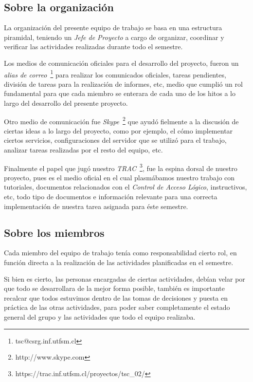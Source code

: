 
\subsection{Sobre la organización}

La organización del presente equipo de trabajo se basa en una estructura piramidal,
teniendo un \emph{Jefe de Proyecto} a cargo de organizar, coordinar y verificar
las actividades realizadas durante todo el semestre.

Los medios de comunicación oficiales para el desarrollo del proyecto,
fueron un \emph{alias de correo}~\footnote{tsc@csrg.inf.utfsm.cl} para realizar los comunicados oficiales,
tareas pendientes, división de tareas para la realización de informes, etc,
medio que cumplió un rol fundamental para que cada miembro se enterara
de cada uno de los hitos a lo largo del desarrollo del presente proyecto.

Otro medio de comunicación fue \emph{Skype}~\footnote{http://www.skype.com} que ayudó fielmente a la discusión
de ciertas ideas a lo largo del proyecto, como por ejemplo, el cómo implementar
ciertos servicios, configuraciones del servidor que se utilizó para el trabajo,
analizar tareas realizadas por el resto del equipo, etc.

Finalmente el papel que jugó nuestro \emph{TRAC}~\footnote{https://trac.inf.utfsm.cl/proyectos/tsc\_02/},
fue la espina dorsal de nuestro proyecto, pues es el medio oficial en el cual plasmábamos
nuestro trabajo con tutoriales, documentos relacionados con el \emph{Control de Acceso Lógico},
instructivos, etc, todo tipo de documentos e información relevante para una correcta implementación
de nuestra tarea asignada para éste semestre.


\subsection{Sobre los miembros}

Cada miembro del equipo de trabajo tenía como responsabilidad cierto rol,
en función directa a la realización de las actividades planificadas en el
semestre.

Si bien es cierto, las personas encargadas de ciertas actividades, debían
velar por que todo se desarrollara de la mejor forma posible, también es
importante recalcar que todos estuvimos dentro de las tomas de decisiones
y puesta en práctica de las otras actividades, para poder saber completamente
el estado general del grupo y las actividades que todo el equipo realizaba.

